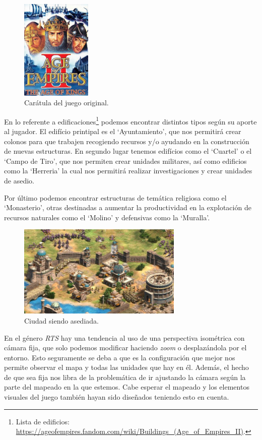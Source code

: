 \begin{figure}[ht]
\centering
\includegraphics[width=0.3\textwidth]{imagenes/marco_teo/referentes/aoe_1.png}
\caption{Carátula del juego original.}
\label{img:aoe_1}
\end{figure}

En lo referente a edificaciones\footnote{Lista de edificios: \url{https://ageofempires.fandom.com/wiki/Buildings_(Age_of_Empires_II)}.}
podemos encontrar distintos tipos según su aporte al jugador.
El edifício printipal es el `Ayuntamiento', que nos permitirá crear colonos para que trabajen
recogiendo recursos y/o ayudando en la construcción de nuevas estructuras. En segundo lugar tenemos
edifícios como el `Cuartel' o el `Campo de Tiro', que nos permiten crear unidades
militares, así como edificios como la `Herreria' la cual nos permitirá realizar investigaciones
y crear unidades de asedio.

Por último podemos encontrar estructuras de temática religiosa como el `Monasterio', otras 
destinadas a aumentar la productividad en la explotación de recursos naturales como el 
`Molino' y defensivas como la `Muralla'. 

\begin{figure}[ht]
\centering
\includegraphics[width=0.7\textwidth]{imagenes/marco_teo/referentes/aoe_2.png}
\caption{Ciudad siendo asediada.}
\label{img:aoe_2}
\end{figure}

En el género \textit{\ac{RTS}} hay una tendencia al uso de una perspectiva isométrica con cámara fija,
que solo podemos modificar haciendo \textit{zoom} o desplazándola por el entorno. Esto seguramente
se deba a que es la configuración que mejor nos permite observar el mapa y todas las unidades que
hay en él. Además, el hecho de que sea fija nos libra de la problemática de ir ajustando la
cámara según la parte del mapeado en la que estemos. Cabe esperar el mapeado y los elementos
visuales del juego también hayan sido diseñados teniendo esto en cuenta.

